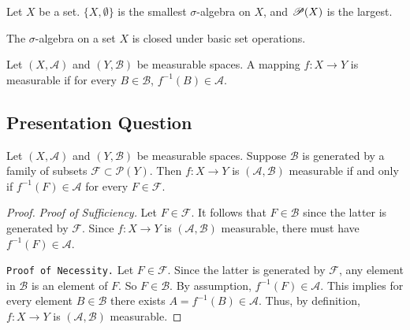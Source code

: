 \documentclass[class=book, crop=false]{standalone}
\begin{document}
        \begin{theorem}
            Let $X$ be a set. $\{X, \emptyset\}$ is the smallest $\sigma$-algebra on $X$, and $\mathscr{P}(X)$ is the largest.
        \end{theorem}

        \begin{remark}
            The $\sigma$-algebra on a set $X$ is closed under basic set operations.
        \end{remark}

        \begin{definition}
            Let $(X, \mathcal{A})$ and $(Y, \mathcal{B})$ be measurable spaces. A mapping $f : X \rightarrow Y$ is measurable if for every $B \in \mathcal{B}$, $f^{-1}(B) \in \mathcal{A}$.
        \end{definition}

        \subsection{Presentation Question}
        \begin{question}
            Let $(X, \mathcal{A})$ and $(Y, \mathcal{B})$ be measurable spaces. Suppose $\mathcal{B}$ is generated by a family of subsets $\mathscr{F} \subset \mathscr{P}(Y)$. Then $f: X \rightarrow Y$ is $(\mathcal{A}, \mathcal{B})$ measurable if and only if $f^{-1}(F) \in \mathcal{A}$ for every $F \in \mathscr{F}$.
        \end{question}
        \begin{proof}
            \textit{Proof of Sufficiency.} Let $F \in \mathscr{F}$. It follows that $F \in \mathcal{B}$ since the latter is generated by $\mathscr{F}$. Since $f : X \rightarrow Y$ is $(\mathcal{A}, \mathcal{B})$ measurable, there must have $f^{-1}(F) \in \mathcal{A}$.
    
            \noindent \texttt{Proof of Necessity.} Let $F \in \mathscr{F}$. Since the latter is generated by $\mathscr{F}$, any element in $\mathcal{B}$ is an element of $F$. So $F \in \mathcal{B}$. By assumption, $f^{-1}(F) \in \mathcal{A}$. This implies for every element $B \in \mathcal{B}$ there exists $A = f^{-1}(B) \in \mathcal{A}$. Thus, by definition, $f: X \rightarrow Y$ is $(\mathcal{A}, \mathcal{B})$ measurable.
        \end{proof}
\end{document}
